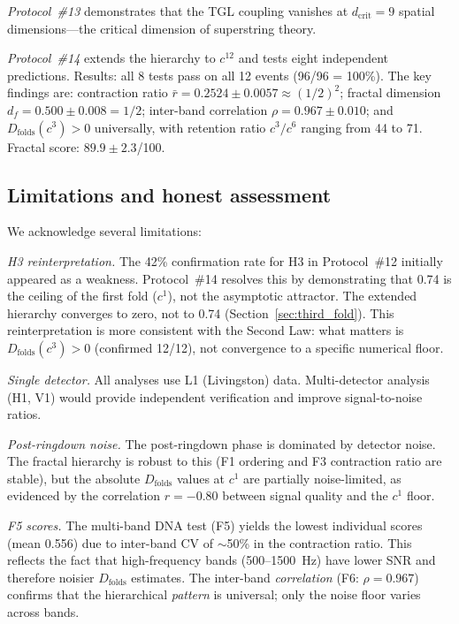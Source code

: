 \documentclass[12pt,a4paper,twocolumn]{article}
\newcommand{\Dfolds}{D_{\text{folds}}}
\begin{document}
\textit{Protocol~\#13} demonstrates that the TGL coupling vanishes at $d_{\text{crit}} = 9$ spatial dimensions---the critical dimension of superstring theory.

\textit{Protocol~\#14} extends the hierarchy to $c^{12}$ and tests eight independent predictions. Results: all 8 tests pass on all 12 events (96/96 = 100\%). The key findings are: contraction ratio $\bar{r} = 0.2524 \pm 0.0057 \approx (1/2)^2$; fractal dimension $d_f = 0.500 \pm 0.008 = 1/2$; inter-band correlation $\rho = 0.967 \pm 0.010$; and $\Dfolds(c^3) > 0$ universally, with retention ratio $c^3/c^6$ ranging from 44 to 71. Fractal score: $89.9 \pm 2.3$/100.

\subsection{Limitations and honest assessment}

We acknowledge several limitations:

\textit{H3 reinterpretation.} The 42\% confirmation rate for H3 in Protocol~\#12 initially appeared as a weakness. Protocol~\#14 resolves this by demonstrating that 0.74 is the ceiling of the first fold ($c^1$), not the asymptotic attractor. The extended hierarchy converges to zero, not to 0.74 (Section~\ref{sec:third_fold}). This reinterpretation is more consistent with the Second Law: what matters is $\Dfolds(c^3) > 0$ (confirmed 12/12), not convergence to a specific numerical floor.

\textit{Single detector.} All analyses use L1 (Livingston) data. Multi-detector analysis (H1, V1) would provide independent verification and improve signal-to-noise ratios.

\textit{Post-ringdown noise.} The post-ringdown phase is dominated by detector noise. The fractal hierarchy is robust to this (F1 ordering and F3 contraction ratio are stable), but the absolute $\Dfolds$ values at $c^1$ are partially noise-limited, as evidenced by the correlation $r = -0.80$ between signal quality and the $c^1$ floor.

\textit{F5 scores.} The multi-band DNA test (F5) yields the lowest individual scores (mean 0.556) due to inter-band CV of $\sim$50\% in the contraction ratio. This reflects the fact that high-frequency bands (500--1500~Hz) have lower SNR and therefore noisier $\Dfolds$ estimates. The inter-band \emph{correlation} (F6: $\rho = 0.967$) confirms that the hierarchical \emph{pattern} is universal; only the noise floor varies across bands.
\end{document}
